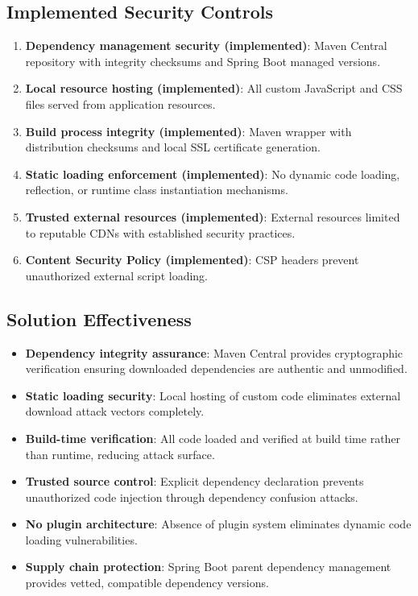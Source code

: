 \documentclass[]{UCD_CS_FYP_Report}
\begin{document}
\subsection{Implemented Security Controls}
\begin{enumerate}
	\item \textbf{Dependency management security (implemented)}: Maven Central repository with integrity checksums and Spring Boot managed versions.
	\item \textbf{Local resource hosting (implemented)}: All custom JavaScript and CSS files served from application resources.
	\item \textbf{Build process integrity (implemented)}: Maven wrapper with distribution checksums and local SSL certificate generation.
	\item \textbf{Static loading enforcement (implemented)}: No dynamic code loading, reflection, or runtime class instantiation mechanisms.
	\item \textbf{Trusted external resources (implemented)}: External resources limited to reputable CDNs with established security practices.
	\item \textbf{Content Security Policy (implemented)}: CSP headers prevent unauthorized external script loading.
\end{enumerate}

\subsection{Solution Effectiveness}
\begin{itemize}
	\item \textbf{Dependency integrity assurance}: Maven Central provides cryptographic verification ensuring downloaded dependencies are authentic and unmodified.
	\item \textbf{Static loading security}: Local hosting of custom code eliminates external download attack vectors completely.
	\item \textbf{Build-time verification}: All code loaded and verified at build time rather than runtime, reducing attack surface.
	\item \textbf{Trusted source control}: Explicit dependency declaration prevents unauthorized code injection through dependency confusion attacks.
	\item \textbf{No plugin architecture}: Absence of plugin system eliminates dynamic code loading vulnerabilities.
	\item \textbf{Supply chain protection}: Spring Boot parent dependency management provides vetted, compatible dependency versions.
\end{itemize}
\end{document}
